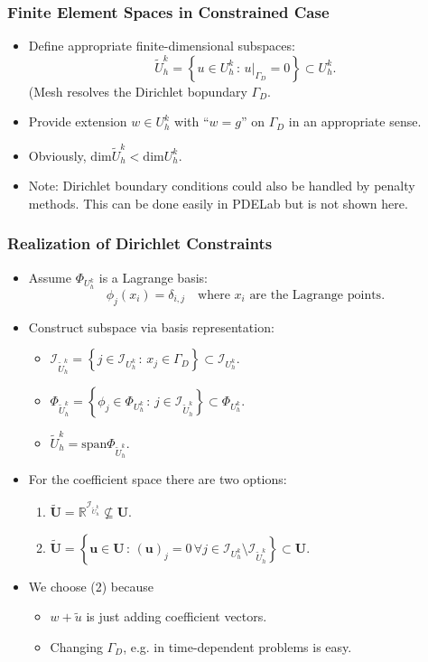 \begin{frame}
\frametitle{Finite Element Spaces in Constrained Case}
\begin{itemize}
\item Define appropriate finite-dimensional subspaces:
\begin{equation*}
\tilde{U}_h^k = \left \{ u \in U_h^k \,:\, u|_{\Gamma_D} = 0 \right\} \subset U_h^k.
\end{equation*}
(Mesh resolves the Dirichlet bopundary $\Gamma_D$.
\item Provide extension $w\in U_h^k$ with ``$w=g$'' on $\Gamma_D$ in an appropriate sense.
\item Obviously, $\text{dim}\tilde{U}_h^k < \text{dim} U_h^k$.
\item Note: Dirichlet boundary conditions could also be handled by penalty methods. 
This can be done easily in PDELab but is not shown here. 
\end{itemize}
\end{frame}

\begin{frame}
\frametitle{Realization of Dirichlet Constraints}
\begin{itemize}
\item Assume $\Phi_{U_h^k}$ is a Lagrange basis: 
\begin{equation*}
\phi_j(x_i)=\delta_{i,j} \quad\text{where $x_i$ are the Lagrange points}.
\end{equation*}
\item Construct subspace via basis representation:
\begin{itemize}
\item $\mathcal{I}_{\tilde{U}_h^k} = \left\{ j\in \mathcal{I}_{U_h^k} \,:\, 
x_j \in \Gamma_D \right\} \subset \mathcal{I}_{U_h^k}$.
\item $\Phi_{\tilde{U}_h^k} = \left\{ \phi_j\in \Phi_{U_h^k} \,:\, 
j \in \mathcal{I}_{\tilde{U}_h^k} \right\} \subset \Phi_{U_h^k}$.
\item $\tilde{U}_h^k = \text{span}\Phi_{\tilde{U}_h^k}$.
\end{itemize}
\item For the coefficient space there are two options:
\begin{enumerate}
\item $\tilde{\mathbf{U}} = \mathbb{R}^{\mathcal{I}_{\tilde{U}_h^k}} \not\subseteq \mathbf{U}$.
\item $\tilde{\mathbf{U}} = \left\{ \mathbf{u}\in\mathbf{U} \,:\, (\mathbf{u})_j = 0 \, \forall
j \in \mathcal{I}_{U_h^k} \setminus \mathcal{I}_{\tilde{U}_h^k} \right\} \subset \mathbf{U}$. 
\end{enumerate}
\item We choose (2) because
\begin{itemize}
\item $w + \tilde{u}$ is just adding coefficient vectors.
\item Changing $\Gamma_D$, e.g. in time-dependent problems is easy.
\end{itemize}
\end{itemize}
\end{frame}


